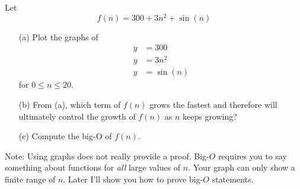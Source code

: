 
Let 
\[
f(n) = 300 + 3n^2 + \sin(n)
\]
\begin{itemize}
\item[(a)] Plot the graphs of 
\begin{align*}
y &= 300 \\
y &= 3n^2 \\
y &= \sin(n)
\end{align*}
for $0 \leq n \leq 20$.
\item[(b)] From (a), which term of $f(n)$ grows the fastest
and therefore will ultimately control
the growth of $f(n)$ as $n$ keeps growing? 
\item[(c)] Compute the big-O of $f(n)$.
\end{itemize}
Note: Using graphs does not really provide a proof.
Big-$O$ requires you to say something about functions
for \textit{all} large values of $n$.
Your graph can only show a finite range of $n$.
Later I'll show you how to prove big-$O$ statements.
